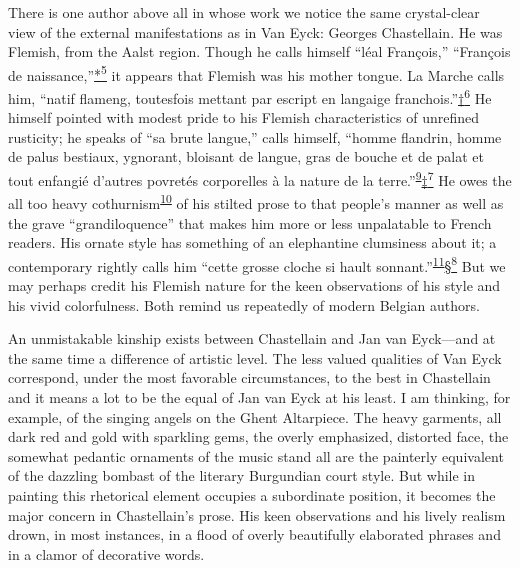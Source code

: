 \protect\hypertarget{21_Chapter_Thirteen__IMAGE_AND_WORD.xhtmlux5cux23page_342}{}{}There
is one author above all in whose work we notice the same crystal-clear
view of the external manifestations as in Van Eyck: Georges Chastellain.
He was Flemish, from the Aalst region. Though he calls himself ``léal
François,'' ``François de
naissance,''\protect\hypertarget{21_Chapter_Thirteen__IMAGE_AND_WORD.xhtmlux5cux23id_2355}{\protect\hyperlink{23_NOTES.xhtmlux5cux23id_2356}{*\textsuperscript{5}}}
it appears that Flemish was his mother tongue. La Marche calls him,
``natif flameng, toutesfois mettant par escript en langaige
franchois.''\protect\hypertarget{21_Chapter_Thirteen__IMAGE_AND_WORD.xhtmlux5cux23id_2357}{\protect\hyperlink{23_NOTES.xhtmlux5cux23id_2358}{†\textsuperscript{6}}}
He himself pointed with modest pride to his Flemish characteristics of
unrefined rusticity; he speaks of ``sa brute langue,'' calls himself,
``homme flandrin, homme de palus bestiaux, ygnorant, bloisant de langue,
gras de bouche et de palat et tout enfangié d'autres povretés
corporelles à la nature de la
terre.''\textsuperscript{\protect\hypertarget{21_Chapter_Thirteen__IMAGE_AND_WORD.xhtmlux5cux23id_291}{\protect\hyperlink{23_NOTES.xhtmlux5cux23id_292}{9}}}\protect\hypertarget{21_Chapter_Thirteen__IMAGE_AND_WORD.xhtmlux5cux23id_2359}{\protect\hyperlink{23_NOTES.xhtmlux5cux23id_2360}{‡\textsuperscript{7}}}
He owes the all too heavy
cothurnism\textsuperscript{\protect\hypertarget{21_Chapter_Thirteen__IMAGE_AND_WORD.xhtmlux5cux23id_289}{\protect\hyperlink{23_NOTES.xhtmlux5cux23id_290}{10}}}
of his stilted prose to that people's manner as well as the grave
``grandiloquence'' that makes him more or less unpalatable to French
readers. His ornate style has something of an elephantine clumsiness
about it; a contemporary rightly calls him ``cette grosse cloche si
hault
sonnant.''\textsuperscript{\protect\hypertarget{21_Chapter_Thirteen__IMAGE_AND_WORD.xhtmlux5cux23id_287}{\protect\hyperlink{23_NOTES.xhtmlux5cux23id_288}{11}}}\protect\hypertarget{21_Chapter_Thirteen__IMAGE_AND_WORD.xhtmlux5cux23id_2361}{\protect\hyperlink{23_NOTES.xhtmlux5cux23id_2362}{§\textsuperscript{8}}}
But we may perhaps credit his Flemish nature for the keen observations
of his style and his vivid colorfulness. Both remind us repeatedly of
modern Belgian authors.

An unmistakable kinship exists between Chastellain and Jan van
Eyck---and at the same time a difference of artistic level. The less
valued qualities of Van Eyck correspond, under the most favorable
circumstances, to the best in Chastellain and it means a lot to be the
equal of Jan van Eyck at his least. I am thinking, for example, of the
singing angels on the Ghent Altarpiece. The heavy garments, all dark red
and gold with sparkling gems, the overly emphasized, distorted face, the
somewhat pedantic ornaments of the music stand all are the painterly
equivalent of the dazzling bombast of the literary Burgundian court
style. But while in painting this rhetorical element occupies a
subordinate position, it becomes the major concern in Chastellain's
prose. His keen observations and his lively realism drown, in most
instances, in a flood of overly beautifully elaborated phrases and in a
clamor of decorative words.

